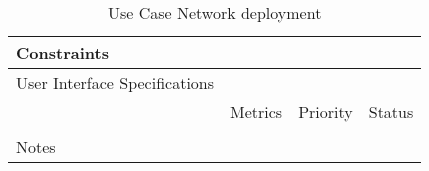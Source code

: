 \begin{table}[H]
\begin{tabularx}{\linewidth}{|l|X|X|X|}
    \hline Constraints                   & \multicolumn{3}{l|}{}                                                                                 \\

    \hline User Interface Specifications & \multicolumn{3}{l|}{}                                                                                 \\

    \hline \multirow{2}{*}{}             & Metrics                                                                           & Priority & Status \\
    \cline{2-4}                          &                                                                                   &          &        \\
    \hline Notes                         & \multicolumn{3}{l|}{}                                                                                 \\
    \hline
  \end{tabularx}
  \caption{Use Case Network deployment}
  \label{tab:use_case_network_deployment}
\end{table}

